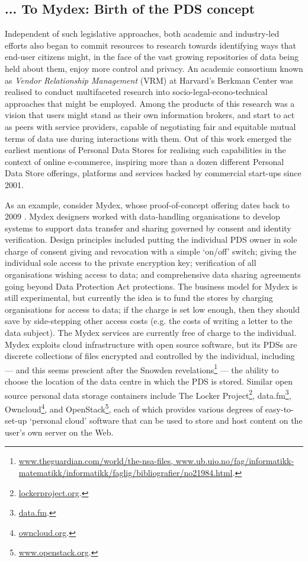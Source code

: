 \documentclass[graybox]{svmult}
\begin{document}
\subsection{... To Mydex: Birth of the PDS concept}

Independent of such legislative approaches, both academic and industry-led efforts also began to commit resources to research towards identifying ways that end-user citizens might, in the face of the vast growing repositories of data being held about them, enjoy more control and privacy. An academic consortium known as \emph{Vendor Relationship Management} (VRM) at Harvard's Berkman Center was realised to conduct multifaceted research into socio-legal-econo-technical approaches that might be employed.  Among the products of this research was a vision that users might stand as their own information brokers, and start to act as peers with service providers, capable of negotiating fair and equitable mutual terms of data use during interactions with them\cite{agustin2001vendor}.  Out of this work emerged the earliest mentions of Personal Data Stores for realising such capabilities in the context of online e-commerce, inspiring more than a dozen different Personal Data Store offerings, platforms and services backed by commercial start-ups since 2001\cite{ctrlshift}. 

As an example, consider Mydex, whose proof-of-concept offering dates back to 2009 \cite{heath2013}. Mydex designers worked with data-handling organisations to develop systems to support data transfer and sharing governed by consent and identity verification. Design principles included putting the individual PDS owner in sole charge of consent giving and revocation with a simple `on/off’ switch; giving the individual sole access to the private encryption key; verification of all organisations wishing access to data; and comprehensive data sharing agreements going beyond Data Protection Act protections. The business model for Mydex is still experimental, but currently the idea is to fund the stores by charging organisations for access to data; if the charge is set low enough, then they should save by side-stepping other access costs (e.g. the costs of writing a letter to the data subject). The Mydex services are currently free of charge to the individual. Mydex exploits cloud infrastructure with open source software, but  its PDSs are discrete collections of files encrypted and controlled by the individual, including --- and this seems prescient after the Snowden revelations\footnote{\url{www.theguardian.com/world/the-nsa-files, www.ub.uio.no/fag/informatikk-matematikk/informatikk/faglig/bibliografier/no21984.html}.} --- the ability to choose the location of the data centre in which the PDS is stored. Similar open source personal data storage containers include The Locker Project\footnote{\url{lockerproject.org}.}, data.fm\footnote{\url{data.fm}.}, Owncloud\footnote{\url{owncloud.org}.}, and OpenStack\footnote{\url{www.openstack.org}.}, each of which provides various degrees of easy-to-set-up `personal cloud’ software that can be used to
store and host content on the user's own server on the Web.
\end{document}
